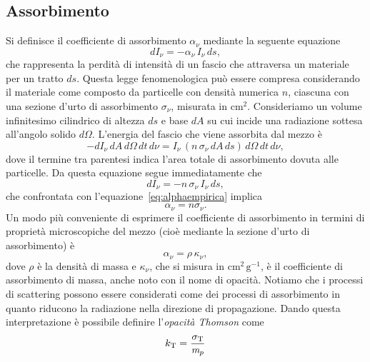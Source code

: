 \subsection{Assorbimento}
Si definisce il coefficiente di assorbimento $\alpha_{\nu}$ mediante la seguente equazione
\begin{equation}
dI_{\nu}=-\alpha_{\nu}\,I_{\nu}\,ds,
\label{eq:alphaempirica}
\end{equation}
che rappresenta la perdità di intensità di un fascio che attraversa un materiale per un tratto $ds$. Questa legge fenomenologica può essere compresa considerando il materiale come composto da particelle con densità numerica $n$, ciascuna con una sezione d'urto di assorbimento $\sigma_{\nu}$, misurata in $\mathrm{cm^2}$. Consideriamo un volume infinitesimo cilindrico di altezza $ds$ e base $dA$ su cui incide una radiazione sottesa all'angolo solido $d\Omega$. L'energia del fascio che viene assorbita dal mezzo è
\begin{equation}
-dI_{\nu}\,dA\,d\Omega\,dt\,d\nu=I_{\nu}\,(n\,\sigma_{\nu}\,dA\,ds)\,d\Omega\,dt\,d\nu,
\end{equation} 
dove il termine tra parentesi indica l'area totale di assorbimento dovuta alle particelle. Da questa equazione segue immediatamente che
\begin{equation}
dI_{\nu}=-n\,\sigma_{\nu}\,I_{\nu}\,ds,
\end{equation}
che confrontata con l'equazione~\ref{eq:alphaempirica} implica
\begin{equation}
\alpha_{\nu}=n\sigma_{\nu}.
\end{equation}
Un modo più conveniente di esprimere il coefficiente di assorbimento in termini di proprietà microscopiche del mezzo (cioè mediante la sezione d'urto di assorbimento) è
\begin{equation}
\alpha_{\nu}=\rho\,\kappa_{\nu},
\end{equation}
dove $\rho$ è la densità di massa e $\kappa_{\nu}$, che si misura in $\mathrm{cm^2\,g^{-1}}$, è il coefficiente di assorbimento di massa, anche noto con il nome di opacità. Notiamo che i processi di scattering possono essere considerati come dei processi di assorbimento in quanto riducono la radiazione nella direzione di propagazione. Dando questa interpretazione è possibile definire l'\textit{opacità Thomson} come 
\begin{equation}
k_\mathrm{T} = \dfrac{\sigma_\mathrm{T}}{\textit{m}_{p}}
\end{equation}



